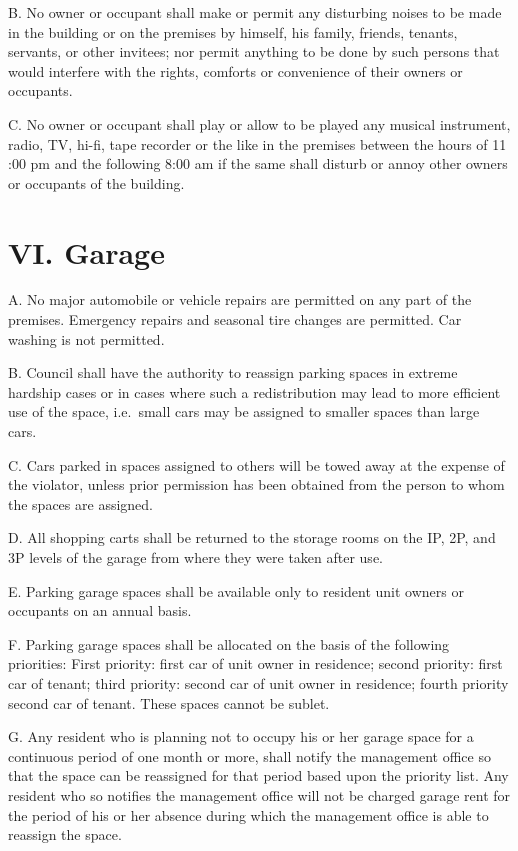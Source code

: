 \documentclass[
]{book}
\begin{document}
B. No owner or occupant shall make or permit any disturbing noises to be made in the building or on the premises by himself, his family, friends, tenants, servants, or other invitees; nor permit anything to be done by such persons that would interfere with the rights, comforts or convenience of their owners or occupants.

C. No owner or occupant shall play or allow to be played any musical instrument, radio, TV, hi-fi, tape recorder or the like in the premises between the hours of 11 :00 pm and the following 8:00 am if the same shall disturb or annoy other owners or occupants of the building.

\hypertarget{vi.-garage}{%
\section*{VI. Garage}\label{vi.-garage}}

A. No major automobile or vehicle repairs are permitted on any part of the premises. Emergency repairs and seasonal tire changes are permitted. Car washing is not permitted.

B. Council shall have the authority to reassign parking spaces in extreme hardship cases or in cases where such a redistribution may lead to more efficient use of the space, i.e.~small cars may be assigned to smaller spaces than large cars.

C. Cars parked in spaces assigned to others will be towed away at the expense of the violator, unless prior permission has been obtained from the person to whom the spaces are assigned.

D. All shopping carts shall be returned to the storage rooms on the IP, 2P, and 3P levels of the garage from where they were taken after use.

E. Parking garage spaces shall be available only to resident unit owners or occupants on an annual basis.

F. Parking garage spaces shall be allocated on the basis of the following priorities: First priority: first car of unit owner in residence; second priority: first car of tenant; third priority: second car of unit owner in residence; fourth priority second car of tenant. These spaces cannot be sublet.

G. Any resident who is planning not to occupy his or her garage space for a continuous period of one month or more, shall notify the management office so that the space can be reassigned for that period based upon the priority list. Any resident who so notifies the management office will not be charged garage rent for the period of his or her absence during which the management office is able to reassign the space.
\end{document}
